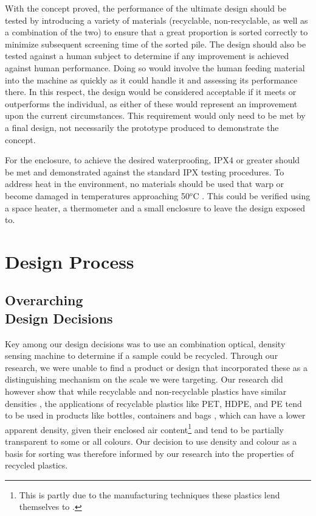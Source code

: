 \documentclass[12pt]{article}
\begin{document}
\begin{multicols*}{2}
            With the concept proved, the performance of the ultimate design should be tested by introducing a variety of materials (recyclable, non-recyclable, as well as a combination of the two) to ensure that a great proportion is sorted correctly to minimize subsequent screening time of the sorted pile. The design should also be tested against a human subject to determine if any improvement is achieved against human performance. Doing so would involve the human feeding material into the machine as quickly as it could handle it and assessing its performance there. In this respect, the design would be considered acceptable if it meets or outperforms the individual, as either of these would represent an improvement upon the current circumstances. This requirement would only need to be met by a final design, not necessarily the prototype produced to demonstrate the concept. 

            For the enclosure, to achieve the desired waterproofing, IPX4 \cite{gniazdo_2021} or greater should be met and demonstrated against the standard IPX testing procedures. To address heat in the environment, no materials should be used that warp or become damaged in temperatures approaching 50$^o$C \cite{GMET}. This could be verified using a space heater, a thermometer and a small enclosure to leave the design exposed to. 

    \section{Design Process}

        \subsection{Overarching \\ Design Decisions}
            Key among our design decisions was to use an combination optical, density sensing machine to determine if a sample could be recycled. Through our research, we were unable to find a product or design that incorporated these as a distinguishing mechanism on the scale we were targeting. Our research did however show that while recyclable and non-recyclable plastics have similar densities \cite{omnexus_2021}, the applications of recyclable plastics like PET, HDPE, and PE tend to be used in products like bottles, containers and bags \cite{HDPE} \cite{amp} \cite{omnexus_2017}, which can have a lower apparent density, given their enclosed air content\footnote{This is partly due to the manufacturing techniques these plastics lend themselves to \cite{thomas_2022}.} and tend to be partially transparent to some or all colours. Our decision to use density and colour as a basis for sorting was therefore informed by our research into the properties of recycled plastics. 
            

\end{multicols*}
\end{document}
